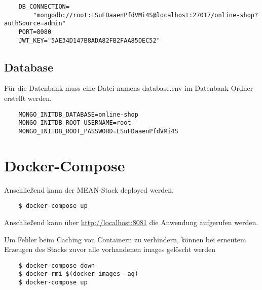 \begin{verbatim}
	DB_CONNECTION=
		"mongodb://root:LSuFDaaenPfdVMi4S@localhost:27017/online-shop?authSource=admin"
	PORT=8080
	JWT_KEY="5AE34D147B8ADA82FB2FAA85DEC52"
\end{verbatim}

\subsection*{Database}
Für die Datenbank muss eine Datei namens database.env im Datenbank Ordner erstellt werden.
\begin{verbatim}
	MONGO_INITDB_DATABASE=online-shop
	MONGO_INITDB_ROOT_USERNAME=root
	MONGO_INITDB_ROOT_PASSWORD=LSuFDaaenPfdVMi4S
\end{verbatim}

\section{Docker-Compose}
Anschließend kann der MEAN-Stack deployed werden.

\begin{verbatim}
	$ docker-compose up
\end{verbatim}

Anschließend kann über \hyperlink{http://localhost:8081}{http://localhost:8081} die Anwendung aufgerufen werden.

Um Fehler beim Caching von Containern zu verhindern, können bei erneutem Erzeugen des Stacks zuvor alle vorhandenen images gelöscht werden

\begin{verbatim}
	$ docker-compose down
	$ docker rmi $(docker images -aq)
	$ docker-compose up
\end{verbatim} 